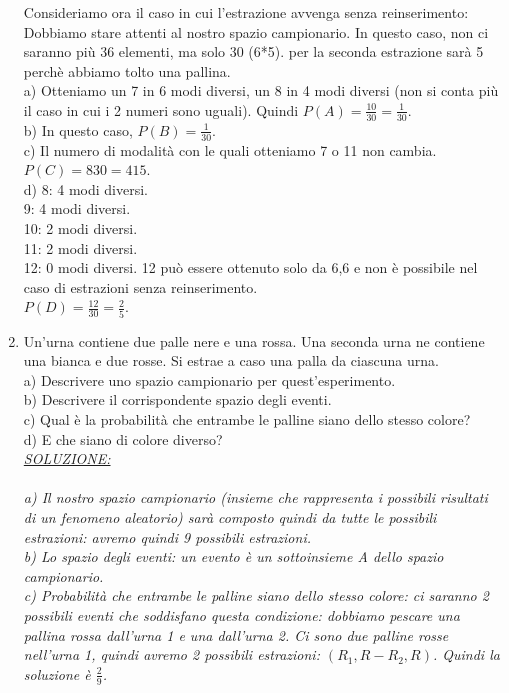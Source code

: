 \documentclass{article}
\begin{document}
\begin{enumerate}
{Consideriamo ora il caso in cui l'estrazione avvenga senza reinserimento:\\
Dobbiamo stare attenti al nostro spazio campionario. In questo caso, non ci saranno più 36 elementi, ma solo 30 (6*5). per la seconda estrazione sarà 5 perchè abbiamo tolto una pallina.\\
a) Otteniamo un 7 in 6 modi diversi, un 8 in 4 modi diversi (non si conta più il caso in cui i 2 numeri sono uguali). Quindi $P(A) = \frac{10}{30} = \frac{1}{30}$.\\
b) In questo caso, $P(B)=\frac{1}{30}$.\\
c) Il numero di modalità con le quali otteniamo 7 o 11 non cambia. $P(C)={8}{30}={4}{15}$.\\
d) 8: 4 modi diversi.\\
9: 4 modi diversi.\\
10: 2 modi diversi.\\
11: 2 modi diversi.\\
12: 0 modi diversi. 12 può essere ottenuto solo da 6,6 e non è possibile nel caso di estrazioni senza reinserimento.\\
$P(D)=\frac{12}{30}=\frac{2}{5}$.
}
\item Un’urna contiene due palle nere e una rossa. Una seconda urna ne contiene una
bianca e due rosse. Si estrae a caso una palla da ciascuna urna.\\
a) Descrivere uno spazio campionario per quest’esperimento.\\
b) Descrivere il corrispondente spazio degli eventi.\\
c) Qual è la probabilità che entrambe le palline siano dello stesso colore?\\
d) E che siano di colore diverso?\\
\emph{\underline{SOLUZIONE:}\\ \\
a) Il nostro spazio campionario (insieme che rappresenta i possibili risultati di un fenomeno aleatorio) sarà composto quindi da tutte le possibili estrazioni: avremo quindi 9 possibili estrazioni.\\
b) Lo spazio degli eventi: un evento è un sottoinsieme A dello spazio campionario.\\
c) Probabilità che entrambe le palline siano dello stesso colore: ci saranno 2 possibili eventi che soddisfano questa condizione: dobbiamo pescare una pallina rossa dall'urna 1 e una dall'urna 2. Ci sono due palline rosse nell'urna 1, quindi avremo 2 possibili estrazioni: $(R_1, R - R_2, R)$. Quindi la soluzione è $\frac{2}{9}$. \\
}
\end{enumerate}
\end{document}
